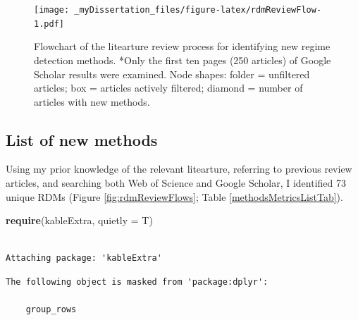 \documentclass[12pt,twoside,openany]{reedthesis}
\newenvironment{Shaded}{\begin{snugshade}}{\end{snugshade}}
\newcommand{\KeywordTok}[1]{\textcolor[rgb]{0.13,0.29,0.53}{\textbf{#1}}}
\newcommand{\DataTypeTok}[1]{\textcolor[rgb]{0.13,0.29,0.53}{#1}}
\newcommand{\DecValTok}[1]{\textcolor[rgb]{0.00,0.00,0.81}{#1}}
\newcommand{\StringTok}[1]{\textcolor[rgb]{0.31,0.60,0.02}{#1}}
\newcommand{\CommentTok}[1]{\textcolor[rgb]{0.56,0.35,0.01}{\textit{#1}}}
\newcommand{\OperatorTok}[1]{\textcolor[rgb]{0.81,0.36,0.00}{\textbf{#1}}}
\newcommand{\NormalTok}[1]{#1}
\begin{document}
\begin{figure}
\centering
\texttt{[image: \_myDissertation\_files/figure-latex/rdmReviewFlow-1.pdf]}
\caption{\label{fig:rdmReviewFlow}Flowchart of the litearture review process
for identifying new regime detection methods. *Only the first ten pages
(250 articles) of Google Scholar results were examined. Node shapes:
folder = unfiltered articles; box = articles actively filtered; diamond
= number of articles with new methods.}
\end{figure}
\subsection{List of new methods}\label{list-of-new-methods}

Using my prior knowledge of the relevant litearture, referring to
previous review articles, and searching both Web of Science and Google
Scholar, I identified 73 unique RDMs (Figure \ref{fig:rdmReviewFlows};
Table \ref{methodsMetricsListTab}).
\begin{Shaded}
\begin{Highlighting}[]
\KeywordTok{require}\NormalTok{(kableExtra, }\DataTypeTok{quietly =}\NormalTok{ T)}
\end{Highlighting}
\end{Shaded}
\begin{verbatim}

Attaching package: 'kableExtra'
\end{verbatim}
\begin{verbatim}
The following object is masked from 'package:dplyr':

    group_rows
\end{verbatim}
\begin{Shaded}
\end{Shaded}
\end{document}
